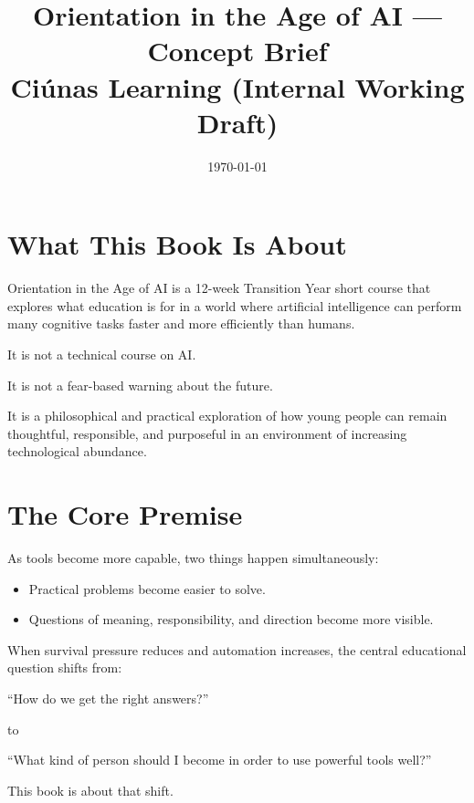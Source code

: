 \documentclass[12pt]{article}
\title{Orientation in the Age of AI — Concept Brief\\[0.35em]\large Ciúnas Learning (Internal Working Draft)}
\author{}
\date{\today}
\begin{document}
\maketitle
\thispagestyle{empty}
\tableofcontents
\newpage

\section*{What This Book Is About}

\begin{tcolorbox}[
  colback=white,
  colframe=purple!40!black,
  opacityframe=0.5,
  fonttitle=\bfseries\color{white},
  title={\mdseries\emoji{open-book}\bfseries Narrative Text},
  drop shadow
]
Orientation in the Age of AI is a 12-week Transition Year short course that explores what education is for in a world where artificial intelligence can perform many cognitive tasks faster and more efficiently than humans.

It is not a technical course on AI.

It is not a fear-based warning about the future.

It is a philosophical and practical exploration of how young people can remain thoughtful, responsible, and purposeful in an environment of increasing technological abundance.
\end{tcolorbox}

\section*{The Core Premise}

As tools become more capable, two things happen simultaneously:
\begin{itemize}
  \item Practical problems become easier to solve.
  \item Questions of meaning, responsibility, and direction become more visible.
\end{itemize}

When survival pressure reduces and automation increases, the central educational question shifts from:

``How do we get the right answers?''

to

``What kind of person should I become in order to use powerful tools well?''

This book is about that shift.
\end{document}
